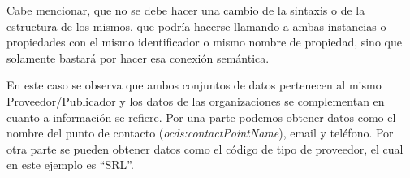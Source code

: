 Cabe mencionar, que no se debe hacer una cambio de la sintaxis o de la estructura de los mismos, que podría hacerse llamando a ambas instancias o propiedades con el mismo identificador o mismo nombre de propiedad, sino que solamente bastará por hacer esa conexión semántica.

En este caso se observa que ambos conjuntos de datos pertenecen al mismo Proveedor/Publicador y los datos de las organizaciones se complementan en cuanto a información se refiere. Por una parte podemos obtener datos como el nombre del punto de contacto (\textit{ocds:contactPointName}), email y teléfono. Por otra parte se pueden obtener datos como el código de tipo de proveedor, el cual en este ejemplo es “SRL”. 

    